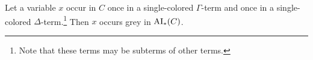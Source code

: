 \documentclass[,%
	draft=false,%
	numbers=noendperiod
	11pt,
	a4paper,
	oneside,%
	openany,
]{memoir}
\begin{document}
\begin{lemma}
	\label{lemma:smallest_colored_container}

	Let a variable $x$ occur in $C$ once in a single-colored $\Gamma$-term and once in a single-colored $\Delta$-term.\footnote{Note that these terms may be subterms of other terms.}
	Then $x$ occurs grey in $\operatorname{AI}_\mathrm{*}(C)$.


\end{lemma}
\end{document}

